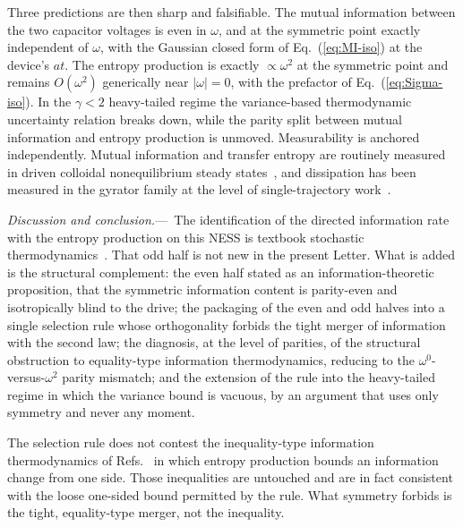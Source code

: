 \documentclass[%
 reprint,
 superscriptaddress,
 nofootinbib,
 nobibnotes,
 amsmath,amssymb,
 aps,
 prl,
 floatfix,
]{revtex4-2}
\newcommand{\plsection}[1]{\par\medskip\noindent\textit{#1.}---\,\ignorespaces}
\begin{document}
Three predictions are then sharp and falsifiable. The mutual information between the two capacitor voltages is even in $\omega$, and at the symmetric point exactly independent of $\omega$, with the Gaussian closed form of Eq.~(\ref{eq:MI-iso}) at the device's $at$. The entropy production is exactly $\propto \omega^2$ at the symmetric point and remains $O(\omega^2)$ generically near $|\omega| = 0$, with the prefactor of Eq.~(\ref{eq:Sigma-iso}). In the $\gamma < 2$ heavy-tailed regime the variance-based thermodynamic uncertainty relation breaks down, while the parity split between mutual information and entropy production is unmoved. Measurability is anchored independently. Mutual information and transfer entropy are routinely measured in driven colloidal nonequilibrium steady states~\cite{Colloidal2025}, and dissipation has been measured in the gyrator family at the level of single-trajectory work~\cite{Chiang2017,Filliger2007}.

\plsection{Discussion and conclusion}%
The identification of the directed information rate with the entropy production on this NESS is textbook stochastic thermodynamics~\cite{Horowitz2014,Ito2013,Sagawa2013,Spinney2016,Maes2020}. That odd half is not new in the present Letter. What is added is the structural complement: the even half stated as an information-theoretic proposition, that the symmetric information content is parity-even and isotropically blind to the drive; the packaging of the even and odd halves into a single selection rule whose orthogonality forbids the tight merger of information with the second law; the diagnosis, at the level of parities, of the structural obstruction to equality-type information thermodynamics, reducing to the $\omega^0$-versus-$\omega^2$ parity mismatch; and the extension of the rule into the heavy-tailed regime in which the variance bound is vacuous, by an argument that uses only symmetry and never any moment.

The selection rule does not contest the inequality-type information thermodynamics of Refs.~\cite{Horowitz2014,Ito2013,Sagawa2013,Seifert2012} in which entropy production bounds an information change from one side. Those inequalities are untouched and are in fact consistent with the loose one-sided bound permitted by the rule. What symmetry forbids is the tight, equality-type merger, not the inequality.
\end{document}
